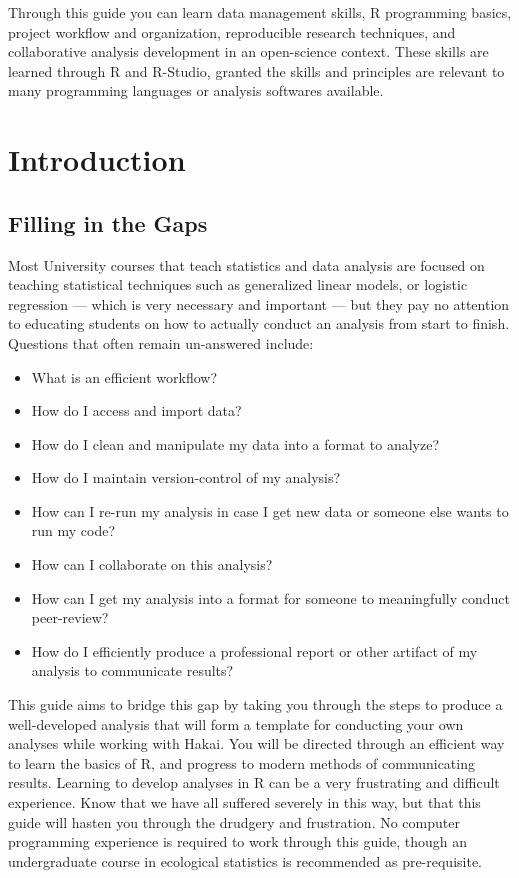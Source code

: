 \documentclass[]{book}
\providecommand{\tightlist}{%
  \setlength{\itemsep}{0pt}\setlength{\parskip}{0pt}}
\begin{document}
Through this guide you can learn data management skills, R programming
basics, project workflow and organization, reproducible research
techniques, and collaborative analysis development in an open-science
context. These skills are learned through R and R-Studio, granted the
skills and principles are relevant to many programming languages or
analysis softwares available.

\chapter{Introduction}\label{introduction}

\section{Filling in the Gaps}\label{filling-in-the-gaps}

Most University courses that teach statistics and data analysis are
focused on teaching statistical techniques such as generalized linear
models, or logistic regression --- which is very necessary and important
--- but they pay no attention to educating students on how to actually
conduct an analysis from start to finish. Questions that often remain
un-answered include:

\begin{itemize}
\tightlist
\item
  What is an efficient workflow?
\item
  How do I access and import data?
\item
  How do I clean and manipulate my data into a format to analyze?
\item
  How do I maintain version-control of my analysis?
\item
  How can I re-run my analysis in case I get new data or someone else
  wants to run my code?
\item
  How can I collaborate on this analysis?
\item
  How can I get my analysis into a format for someone to meaningfully
  conduct peer-review?
\item
  How do I efficiently produce a professional report or other artifact
  of my analysis to communicate results?
\end{itemize}

This guide aims to bridge this gap by taking you through the steps to
produce a well-developed analysis that will form a template for
conducting your own analyses while working with Hakai. You will be
directed through an efficient way to learn the basics of R, and progress
to modern methods of communicating results. Learning to develop analyses
in R can be a very frustrating and difficult experience. Know that we
have all suffered severely in this way, but that this guide will hasten
you through the drudgery and frustration. No computer programming
experience is required to work through this guide, though an
undergraduate course in ecological statistics is recommended as
pre-requisite.
\end{document}
